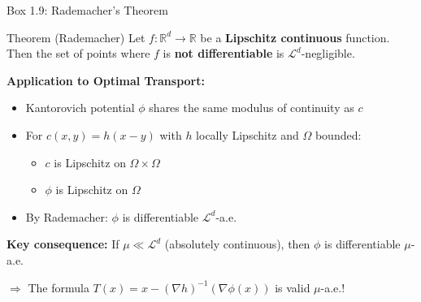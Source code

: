 \documentclass[aspectratio=169]{beamer}
\newcommand{\R}{\mathbb{R}}
\newcommand{\Ld}{\mathcal{L}^d}
\begin{document}
\begin{frame}{Box 1.9: Rademacher's Theorem}
\begin{block}{Theorem (Rademacher)}
Let $f: \R^d \to \R$ be a \textbf{Lipschitz continuous} function. Then the set of points where $f$ is \textbf{not differentiable} is $\Ld$-negligible.
\end{block}

\vspace{0.3cm}
\textbf{Application to Optimal Transport:}

\begin{itemize}
    \item Kantorovich potential $\phi$ shares the same modulus of continuity as $c$
    \item For $c(x,y) = h(x-y)$ with $h$ locally Lipschitz and $\Omega$ bounded:
    \begin{itemize}
        \item $c$ is Lipschitz on $\Omega \times \Omega$
        \item $\phi$ is Lipschitz on $\Omega$
    \end{itemize}
    \item By Rademacher: $\phi$ is differentiable $\Ld$-a.e.
\end{itemize}

\vspace{0.3cm}
\textbf{Key consequence:} If $\mu \ll \Ld$ (absolutely continuous), then $\phi$ is differentiable $\mu$-a.e.

\vspace{0.2cm}
$\Rightarrow$ The formula $T(x) = x - (\nabla h)^{-1}(\nabla\phi(x))$ is valid $\mu$-a.e.!
\end{frame}
\end{document}
